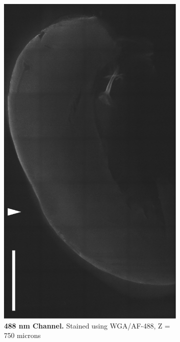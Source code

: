 \begin{figure}[H]
\centering
    \begin{subfigure}[t]{0.48\textwidth}
        \includegraphics[width=1\linewidth]{Images/T_Sham_R_Figure_Draft_488_2.png}
        \caption{\textbf{488 nm Channel.} Stained using WGA/AF-488, Z = 750 microns}
    \end{subfigure}
        \medskip
    ~
    \begin{subfigure}[t]{0.48\textwidth}

\end{subfigure}
\end{figure}
